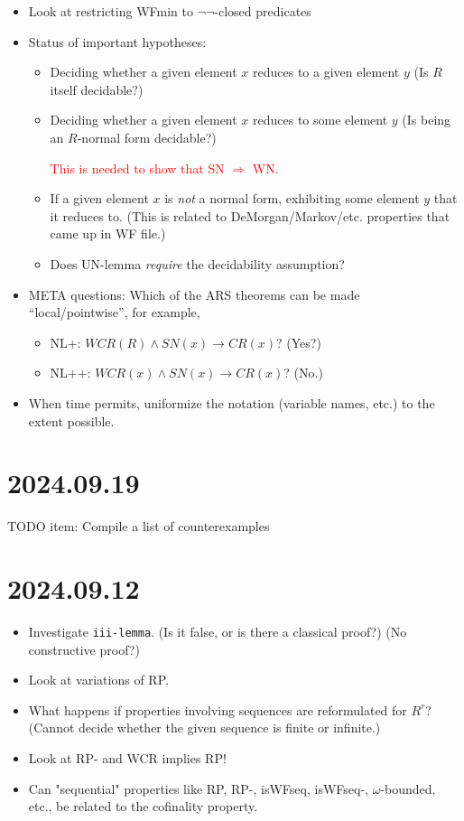 \documentclass{scrartcl}
\begin{document}
\begin{itemize}
  \item Look at restricting WFmin to $\lnot\lnot$-closed predicates
  \item Status of important hypotheses:
    \begin{itemize}
      \item Deciding whether a given element $x$ reduces to a given element $y$
      (Is $R$ itself decidable?)
      \item Deciding whether a given element $x$ reduces to some element $y$
      (Is being an $R$-normal form decidable?)

      {\textcolor{red}{This is needed to show that SN $\Rightarrow$ WN.}}

      \item If a given element $x$ is \emph{not} a normal form,
      exhibiting some element $y$ that it reduces to.
      (This is related to DeMorgan/Markov/etc. properties that came up in WF file.)

      \item Does UN-lemma \emph{require} the decidability assumption?
    \end{itemize}
  \item META questions: Which of the ARS theorems can be made ``local/pointwise'',
  for example,
  \begin{itemize}
    \item NL+: $WCR(R) \land SN(x) \to CR(x)$?  (Yes?)
    \item NL++: $WCR(x) \land SN(x) \to CR(x)$? (No.)
  \end{itemize}
  \item When time permits, uniformize the notation (variable names, etc.) to the extent possible.
\end{itemize}

\section{2024.09.19}

TODO item: Compile a list of counterexamples

\section{2024.09.12}
\begin{itemize}
  \item Investigate \texttt{iii-lemma}.  (Is it false, or is there a classical proof?)
  (No constructive proof?)
  \item Look at variations of RP.
  \item What happens if properties involving sequences are reformulated for
  $R^r$? (Cannot decide whether the given sequence is finite or infinite.)
  \item Look at RP- and WCR implies RP!
  \item Can "sequential" properties like RP, RP-, isWFseq, isWFseq-, $\omega$-bounded, etc.,
  be related to the cofinality property.
\end{itemize}
\end{document}
